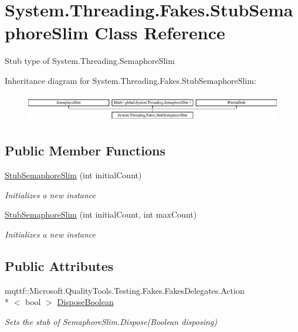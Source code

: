 \hypertarget{class_system_1_1_threading_1_1_fakes_1_1_stub_semaphore_slim}{\section{System.\-Threading.\-Fakes.\-Stub\-Semaphore\-Slim Class Reference}
\label{class_system_1_1_threading_1_1_fakes_1_1_stub_semaphore_slim}
}


Stub type of System.\-Threading.\-Semaphore\-Slim 


Inheritance diagram for System.\-Threading.\-Fakes.\-Stub\-Semaphore\-Slim\-:\begin{figure}[H]
\begin{center}
\leavevmode
\includegraphics[height=1.236203cm]{class_system_1_1_threading_1_1_fakes_1_1_stub_semaphore_slim}
\end{center}
\end{figure}
\subsection*{Public Member Functions}
\begin{DoxyCompactItemize}
\item 
\hyperlink{class_system_1_1_threading_1_1_fakes_1_1_stub_semaphore_slim_acf8391a68bdb2e68217515da40d6f91d}{Stub\-Semaphore\-Slim} (int initial\-Count)
\begin{DoxyCompactList}\small\item\em Initializes a new instance\end{DoxyCompactList}\item 
\hyperlink{class_system_1_1_threading_1_1_fakes_1_1_stub_semaphore_slim_a08f02f95751610c2548286e199f8ebf8}{Stub\-Semaphore\-Slim} (int initial\-Count, int max\-Count)
\begin{DoxyCompactList}\small\item\em Initializes a new instance\end{DoxyCompactList}\end{DoxyCompactItemize}
\subsection*{Public Attributes}
\begin{DoxyCompactItemize}
\item 
mqttf\-::\-Microsoft.\-Quality\-Tools.\-Testing.\-Fakes.\-Fakes\-Delegates.\-Action\\*
$<$ bool $>$ \hyperlink{class_system_1_1_threading_1_1_fakes_1_1_stub_semaphore_slim_aac5dce7785720e373dfd2d9d72d432cd}{Dispose\-Boolean}
\begin{DoxyCompactList}\small\item\em Sets the stub of Semaphore\-Slim.\-Dispose(\-Boolean disposing)\end{DoxyCompactList}\end{DoxyCompactItemize}
